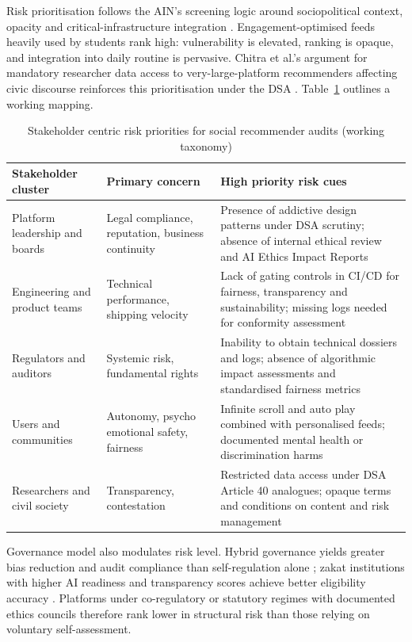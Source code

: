 \documentclass[11pt]{article}
\begin{document}
Risk prioritisation follows the AIN's screening logic around sociopolitical context, opacity and critical-infrastructure integration \parencites[3]{2742041}. Engagement-optimised feeds heavily used by students rank high: vulnerability is elevated, ranking is opaque, and integration into daily routine is pervasive. Chitra et al.'s argument for mandatory researcher data access to very-large-platform recommenders affecting civic discourse reinforces this prioritisation under the DSA \parencites[2248]{6502223}. Table~\ref{tab:stakeholder_risk_priorities} outlines a working mapping. \begin{table}[H] \centering \caption{Stakeholder centric risk priorities for social recommender audits (working taxonomy)} \label{tab:stakeholder_risk_priorities} \begin{tabular}{p{3cm}p{4.2cm}p{4.5cm}} \hline Stakeholder cluster & Primary concern & High priority risk cues \\ \hline Platform leadership and boards & Legal compliance, reputation, business continuity & Presence of addictive design patterns under DSA scrutiny; absence of internal ethical review and AI Ethics Impact Reports \parencites[2]{8958037}[61--62]{2977039} \\ Engineering and product teams & Technical performance, shipping velocity & Lack of gating controls in CI/CD for fairness, transparency and sustainability; missing logs needed for conformity assessment \parencites[24]{8367105}[19.5]{2977039} \\ Regulators and auditors & Systemic risk, fundamental rights & Inability to obtain technical dossiers and logs; absence of algorithmic impact assessments and standardised fairness metrics \parencites[19]{3195574}[15]{5442231} \\ Users and communities & Autonomy, psycho emotional safety, fairness & Infinite scroll and auto play combined with personalised feeds; documented mental health or discrimination harms \parencites[2]{8958037}[2]{3303310}{4245543} \\ Researchers and civil society & Transparency, contestation & Restricted data access under DSA Article 40 analogues; opaque terms and conditions on content and risk management \parencites[19]{3195574} \\ \hline \end{tabular} \end{table} Governance model also modulates risk level. Hybrid governance yields greater bias reduction and audit compliance than self-regulation alone \parencites[2]{0375818}; zakat institutions with higher AI readiness and transparency scores achieve better eligibility accuracy \parencites{2702055}. Platforms under co-regulatory or statutory regimes with documented ethics councils therefore rank lower in structural risk than those relying on voluntary self-assessment.
\end{document}
